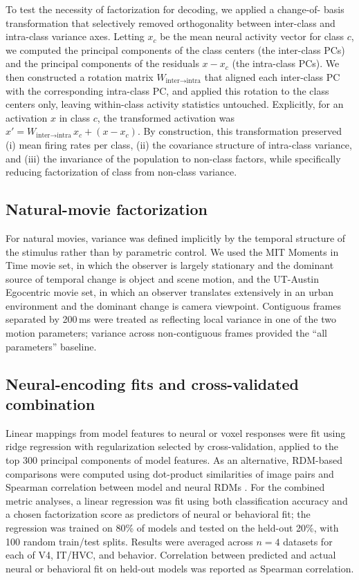 \documentclass[11pt]{article}
\begin{document}
To test the necessity of factorization for decoding, we applied a change-of-
basis transformation that selectively removed orthogonality between
inter-class and intra-class variance axes. Letting \(x_c\) be the mean
neural activity vector for class \(c\), we computed the principal components
of the class centers (the inter-class PCs) and the principal components of
the residuals \(x - x_c\) (the intra-class PCs). We then constructed a
rotation matrix \(W_{\text{inter}\to\text{intra}}\) that aligned each
inter-class PC with the corresponding intra-class PC, and applied this
rotation to the class centers only, leaving within-class activity
statistics untouched. Explicitly, for an activation \(x\) in class \(c\),
the transformed activation was
\(x' = W_{\text{inter}\to\text{intra}}\,x_c + (x - x_c)\). By construction,
this transformation preserved (i) mean firing rates per class, (ii) the
covariance structure of intra-class variance, and (iii) the invariance of
the population to non-class factors, while specifically reducing
factorization of class from non-class variance.

\subsection{Natural-movie factorization}

For natural movies, variance was defined implicitly by the temporal
structure of the stimulus rather than by parametric control. We used the MIT
Moments in Time movie set, in which the observer is largely stationary and
the dominant source of temporal change is object and scene motion, and the
UT-Austin Egocentric movie set, in which an observer translates extensively
in an urban environment and the dominant change is camera viewpoint.
Contiguous frames separated by 200\,ms were treated as reflecting local
variance in one of the two motion parameters; variance across non-contiguous
frames provided the ``all parameters'' baseline.

\subsection{Neural-encoding fits and cross-validated combination}

Linear mappings from model features to neural or voxel responses were fit
using ridge regression with regularization selected by cross-validation,
applied to the top 300 principal components of model features. As an
alternative, RDM-based comparisons were computed using dot-product
similarities of image pairs and Spearman correlation between model and
neural RDMs \citep{kriegeskorte2008representational}. For the combined
metric analyses, a linear regression was fit using both classification
accuracy and a chosen factorization score as predictors of neural or
behavioral fit; the regression was trained on 80\% of models and tested on
the held-out 20\%, with 100 random train/test splits. Results were averaged
across \(n=4\) datasets for each of V4, IT/HVC, and behavior. Correlation
between predicted and actual neural or behavioral fit on held-out models
was reported as Spearman correlation.
\end{document}
